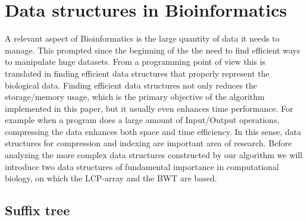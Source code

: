 \documentclass[a4paper,12pt, oneside]{article}
\begin{document}
\newpage
\section{Data structures in Bioinformatics}

A relevant aspect of Bioinformatics is the large quantity of data it needs to manage. This prompted since the beginning of the  the need to find efficient ways to manipulate huge datasets. From a programming point of view this is translated in finding efficient data structures that properly represent the biological data. Finding efficient data structures not only reduces the storage/memory usage, which is the primary objective of the algorithm implemented in this paper, but it usually even enhances time performance. For example when a program does a large amount of Input/Output operations, compressing the data enhances both space and time efficiency. In this sense, data structures for compression and indexing are important area of research. Before analyzing the more complex data structures constructed by our algorithm we will introduce two data structures of fundamental importance in computational biology, on which the LCP-array and the BWT are based.

\subsection{Suffix tree}
\end{document}
